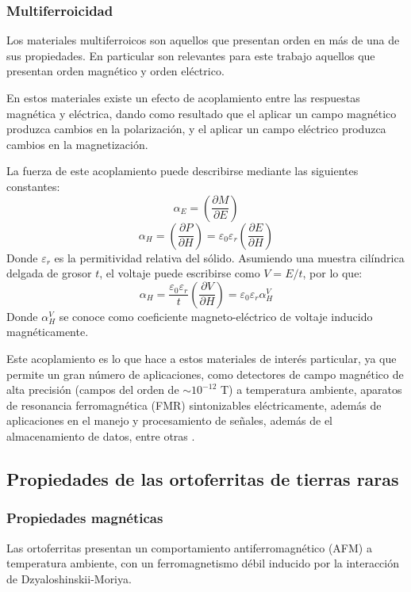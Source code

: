 \documentclass[../main.tex]{subfiles}
\begin{document}
\subsubsection{Multiferroicidad} \label{sec:multif}
Los materiales multiferroicos son aquellos que presentan orden en más de una de sus propiedades. En particular son relevantes para este trabajo aquellos que presentan orden magnético y orden eléctrico.

En estos materiales existe un efecto de acoplamiento entre las respuestas magnética y eléctrica, dando como resultado que el aplicar un campo magnético produzca cambios en la polarización, y el aplicar un campo eléctrico produzca cambios en la magnetización.

La fuerza de este acoplamiento puede describirse mediante las siguientes constantes:
\begin{equation}
    \alpha_E=\left(\dfrac{\partial M}{\partial E}\right)
    \label{eq:alphaE}
\end{equation}
\begin{equation}
    \alpha_H=\left(\dfrac{\partial P}{\partial H}\right)=\varepsilon_0\varepsilon_r\left(\dfrac{\partial E}{\partial H}\right)
    \label{eq:alphaH}
\end{equation}
Donde $\varepsilon_r$ es la permitividad relativa del sólido. Asumiendo una muestra cilíndrica delgada de grosor $t$, el voltaje puede escribirse como $V=E/t$, por lo que:
\begin{equation}
    \alpha_H=\dfrac{\varepsilon_0\varepsilon_r}{t}\left(\dfrac{\partial V}{\partial H}\right)=\varepsilon_0\varepsilon_r\alpha_H^V
    \label{eq:alphaHV}
\end{equation}
Donde $\alpha_H^V$ se conoce como coeficiente  magneto-eléctrico de voltaje inducido magnéticamente.

Este acoplamiento es lo que hace a estos materiales de interés particular, ya que permite un gran número de aplicaciones, como detectores de campo magnético de alta precisión (campos del orden de $\sim10^{-12}$ T) a temperatura ambiente, aparatos de resonancia ferromagnética (FMR) sintonizables eléctricamente, además de aplicaciones en el manejo y procesamiento de señales, además de el almacenamiento de datos, entre otras \cite{Vopson2015}.
\subsection{Propiedades de las ortoferritas de tierras raras}
\subsubsection{Propiedades magnéticas}
Las ortoferritas  presentan un comportamiento antiferromagnético (AFM) a temperatura ambiente, con un ferromagnetismo débil inducido por la interacción de Dzyaloshinskii-Moriya.
\end{document}
